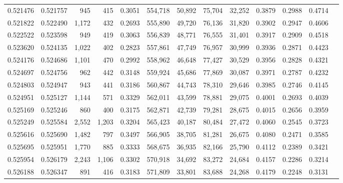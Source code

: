 \begin{tabular}{rrrrrrrrrrrrr}
0.521476 & 0.521757 &    945 &   415 &                                     0.3051 & 554,718 &  50,892 &  75,704 &  32,252 & 0.3879 & 0.2988 & 0.4714 \\
0.521822 & 0.522490 &  1,172 &   432 &                                     0.2693 & 555,890 &  49,720 &  76,136 &  31,820 & 0.3902 & 0.2947 & 0.4606 \\
0.522522 & 0.523598 &    949 &   419 &                                     0.3063 & 556,839 &  48,771 &  76,555 &  31,401 & 0.3917 & 0.2909 & 0.4518 \\
0.523620 & 0.524135 &  1,022 &   402 &                                     0.2823 & 557,861 &  47,749 &  76,957 &  30,999 & 0.3936 & 0.2871 & 0.4423 \\
0.524176 & 0.524686 &  1,101 &   470 &                                     0.2992 & 558,962 &  46,648 &  77,427 &  30,529 & 0.3956 & 0.2828 & 0.4321 \\
0.524697 & 0.524756 &    962 &   442 &                                     0.3148 & 559,924 &  45,686 &  77,869 &  30,087 & 0.3971 & 0.2787 & 0.4232 \\
0.524803 & 0.524947 &    943 &   441 &                                     0.3186 & 560,867 &  44,743 &  78,310 &  29,646 & 0.3985 & 0.2746 & 0.4145 \\
0.524951 & 0.525127 &  1,144 &   571 &                                     0.3329 & 562,011 &  43,599 &  78,881 &  29,075 & 0.4001 & 0.2693 & 0.4039 \\
0.525169 & 0.525246 &    860 &   400 &                                     0.3175 & 562,871 &  42,739 &  79,281 &  28,675 & 0.4015 & 0.2656 & 0.3959 \\
0.525249 & 0.525584 &  2,552 & 1,203 &                                     0.3204 & 565,423 &  40,187 &  80,484 &  27,472 & 0.4060 & 0.2545 & 0.3723 \\
0.525616 & 0.525690 &  1,482 &   797 &                                     0.3497 & 566,905 &  38,705 &  81,281 &  26,675 & 0.4080 & 0.2471 & 0.3585 \\
0.525695 & 0.525951 &  1,770 &   885 &                                     0.3333 & 568,675 &  36,935 &  82,166 &  25,790 & 0.4112 & 0.2389 & 0.3421 \\
0.525954 & 0.526179 &  2,243 & 1,106 &                                     0.3302 & 570,918 &  34,692 &  83,272 &  24,684 & 0.4157 & 0.2286 & 0.3214 \\
0.526188 & 0.526347 &    891 &   416 &                                     0.3183 & 571,809 &  33,801 &  83,688 &  24,268 & 0.4179 & 0.2248 & 0.3131 \\

\end{tabular}
